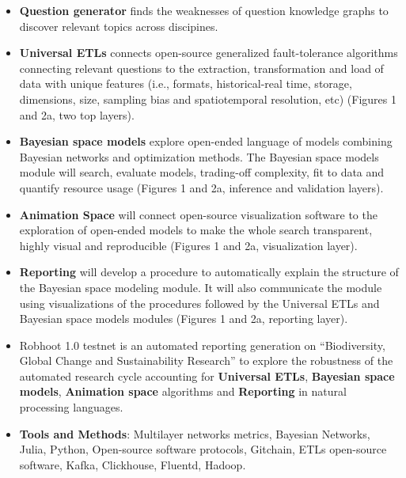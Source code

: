 \documentclass[12pt, a4paper]{article} %
\begin{document}
  \begin{itemize}
  \item {\bf Question generator} finds the weaknesses of question
    knowledge graphs to discover relevant topics across discipines.
  \item {\bf Universal ETLs} connects open-source generalized
    fault-tolerance algorithms connecting relevant questions to the
    extraction, transformation and load of data with unique features
    (i.e., formats, historical-real time, storage, dimensions, size,
    sampling bias and spatiotemporal resolution, etc) (Figures 1 and
    2a, two top layers).
   \item {\bf Bayesian space models} explore open-ended language of
     models combining Bayesian networks and optimization methods. The
     Bayesian space models module will search, evaluate models,
     trading-off complexity, fit to data and quantify resource usage
     (Figures 1 and 2a, inference and validation layers). 
   \item {\bf Animation Space} will connect open-source visualization
     software to the exploration of open-ended models to make the
     whole search transparent, highly visual and reproducible (Figures
     1 and 2a, visualization layer).
   \item {\bf Reporting} will develop a procedure to automatically
     explain the structure of the Bayesian space modeling module. It
     will also communicate the module using visualizations of the
     procedures followed by the Universal ETLs and Bayesian space
     models modules (Figures 1 and 2a, reporting layer).
   \item Robhoot 1.0 testnet is an automated reporting generation on
     ``Biodiversity, Global Change and Sustainability Research'' to
     explore the robustness of the automated research cycle accounting
     for {\bf Universal ETLs}, {\bf Bayesian space models}, {\bf
       Animation space} algorithms and {\bf Reporting} in natural
     processing languages.
   \end{itemize}

   \begin{itemize}
   \item {\bf Tools and Methods}: Multilayer networks metrics,
     Bayesian Networks, Julia, Python, Open-source software protocols,
     Gitchain, ETLs open-source software, Kafka, Clickhouse, Fluentd,
     Hadoop.
   \end{itemize}

     
\end{document}
